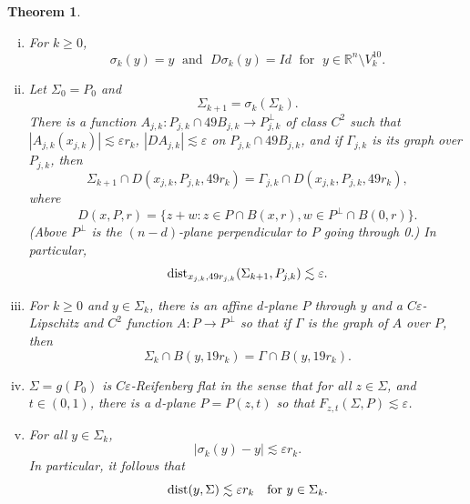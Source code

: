 \documentclass[11pt]{amsart}
\newcommand{\R}{{\mathbb R}}       %
\newcommand{\dist}{{\rm dist}}
\newcommand{\ve}{{\varepsilon}}
\newtheorem{theorem}{Theorem}[section]
\theoremstyle{definition}
\theoremstyle{remark}
\numberwithin{equation}{section}
\def\lec{\lesssim}
\def\lec{\lesssim}
\newcommand{\hdis}[1]{{\mbox{\dist}}_{#1}}
\begin{document}
\begin{theorem}
\begin{enumerate}[(i)]
		\item \cite[Equation (4.5)]{DT12} For $k\geq 0$,
		\begin{equation}\label{e:v10c}
		\sigma_{k}(y)=y \;\mbox{ and } \;D\sigma_{k}(y)=Id\; \mbox{ for } \;y\in \R^{n}\setminus V_{k}^{10}.
		\end{equation}
		\item\cite[Proposition 5.1]{DT12} Let $\Sigma_{0}=P_{0}$ and
		\[
		\Sigma_{k+1}=\sigma_{k}(\Sigma_{k}).\] 
		There is a function $A_{j,k}: P_{j,k}\cap 49B_{j,k}\rightarrow P_{j,k}^{\perp}$ of class $C^{2}$ such that $|A_{j,k}(x_{j,k})|\lec \ve r_{k}$, $|DA_{j,k}|\lec \ve$ on $P_{j,k}\cap 49B_{j,k}$, and if $\Gamma_{j,k}$ is its graph over $P_{j,k}$, then 
		\begin{equation}\label{e:49graph}
		\Sigma_{k+1}\cap D(x_{j,k},P_{j,k},49r_{k})=\Gamma_{j,k}\cap  D(x_{j,k},P_{j,k},49r_{k}),
		\end{equation}
		where 
		\begin{equation}\label{e:D-is-a-cylinder}
		D(x,P,r)=\{z+w: z\in P\cap B(x,r), w\in P^{\perp} \cap B(0,r)\}. 
		\end{equation}
		(Above $P^\perp$ is the $(n-d)$-plane perpendicular to $P$ going through 0.)
		In particular,
		\begin{equation}
		\hdis{x_{j,k},49r_{j,k}}(\Sigma_{k+1},P_{j,k})\lec\ve.
		\label{e:49r}
		\end{equation}
		\item \cite[Lemma 6.2]{DT12} For $k\geq 0$ and $y\in \Sigma_{k}$, there is an affine $d$-plane $P$ through $y$ and a $C\ve$-Lipschitz and $C^{2}$ function $A:P\rightarrow P^{\perp}$ so that if $\Gamma$ is the graph of $A$ over $P$, then 
		\begin{equation}\label{e:ygraph}
		\Sigma_{k}\cap B(y,19r_{k})=\Gamma\cap B(y,19r_{k}).
		\end{equation}
		\item \cite[Proposition 6.3]{DT12} $\Sigma=g(P_0)$ is $C\ve$-Reifenberg flat in the sense that for all $z\in \Sigma$, and $t\in (0,1)$, there is a $d$-plane $P=P(z,t)$ so that $F_{z,t}(\Sigma,P)\lec \ve$. 
		\item \cite[Equation (6.7)]{DT12} For all $y\in \Sigma_{k}$, 
		\begin{equation}\label{e:sky-y}
		|\sigma_{k}(y)-y|\lec \ve r_{k}.
		\end{equation}
		In particular, it follows that
		\begin{equation}\label{e:ytosigma}
		\dist(y,\Sigma)\lec \ve r_{k}\quad \mbox{for }y\in \Sigma_{k}.
		\end{equation}
		

\end{enumerate}
\end{theorem}
\end{document}
